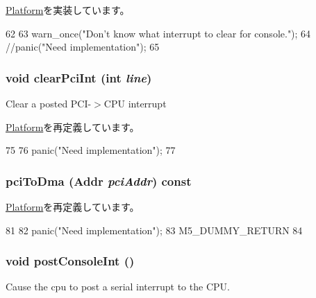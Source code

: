 \hyperlink{classPlatform_aaf1bfcf0f5ac95c6a9d1607172a5a29e}{Platform}を実装しています。


\begin{DoxyCode}
62 {
63     warn_once("Don't know what interrupt to clear for console.\n");
64     //panic("Need implementation\n");
65 }
\end{DoxyCode}
\hypertarget{classT1000_a0d98ea2b236bb883fa15d63a59a2ec9e}{
\subsubsection[{clearPciInt}]{\setlength{\rightskip}{0pt plus 5cm}void clearPciInt (int {\em line})}}
\label{classT1000_a0d98ea2b236bb883fa15d63a59a2ec9e}
Clear a posted PCI-\/$>$CPU interrupt 

\hyperlink{classPlatform_a0d98ea2b236bb883fa15d63a59a2ec9e}{Platform}を再定義しています。


\begin{DoxyCode}
75 {
76     panic("Need implementation\n");
77 }
\end{DoxyCode}
\hypertarget{classT1000_a87078b3d3a28ae134f6736337e90dac3}{
\subsubsection[{pciToDma}]{ pciToDma ({\bf Addr} {\em pciAddr}) const}}
\label{classT1000_a87078b3d3a28ae134f6736337e90dac3}


\hyperlink{classPlatform_a87078b3d3a28ae134f6736337e90dac3}{Platform}を再定義しています。


\begin{DoxyCode}
81 {
82     panic("Need implementation\n");
83     M5_DUMMY_RETURN
84 }
\end{DoxyCode}
\hypertarget{classT1000_a5b278cebc0a62bc2195edf27f059ab1a}{
\subsubsection[{postConsoleInt}]{\setlength{\rightskip}{0pt plus 5cm}void postConsoleInt ()}}
\label{classT1000_a5b278cebc0a62bc2195edf27f059ab1a}
Cause the cpu to post a serial interrupt to the CPU. 

